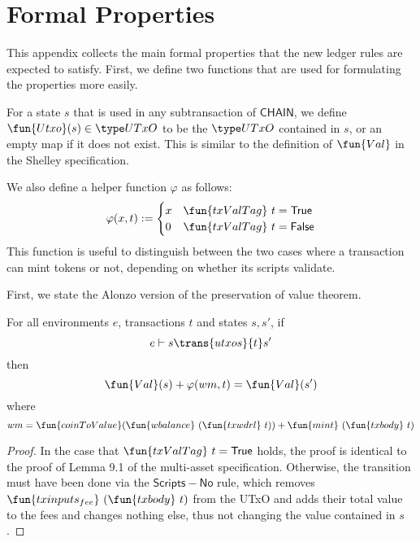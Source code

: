 \newcommand{\Val}{\fun{Val}}
\newcommand{\Utxo}{\fun{Utxo}}

\section{Formal Properties}
\label{sec:properties}

This appendix collects the main formal properties that the new ledger
rules are expected to satisfy. First, we define two functions that are
used for formulating the properties more easily.

\begin{definition}
  For a state $s$ that is used in any subtransaction of
  $\mathsf{CHAIN}$, we define $\Utxo(s) \in \UTxO$ to be the $\UTxO$
  contained in $s$, or an empty map if it does not exist. This is
  similar to the definition of $\Val$ in the Shelley specification.
\end{definition}

We also define a helper function $\varphi$ as follows:
\[\varphi(x, t) :=
  \begin{cases}
    x & \fun{txValTag}~t = \True \\
    0 & \fun{txValTag}~t = \False
  \end{cases}\]
This function is useful to distinguish between the two
cases where a transaction can mint tokens or not, depending on whether
its scripts validate.

First, we state the Alonzo version of the preservation of value theorem.

\begin{lemma}
  For all environments $e$, transactions $t$ and states $s, s'$, if
  \begin{equation*}
    e\vdash s\trans{utxos}{t}s'
  \end{equation*}
  then
  \begin{equation*}
    \Val(s) + \varphi(wm, t) = \Val(s')
  \end{equation*}
  where
  \begin{equation*}
    wm = \fun{coinToValue} (\fun{wbalance}~(\fun{txwdrl}~t)) + \fun{mint}~(\fun{txbody}~t)
  \end{equation*}
\end{lemma}
\begin{proof}
  In the case that $\fun{txValTag}~t = \True$ holds, the proof is
  identical to the proof of Lemma 9.1 of the multi-asset
  specification. Otherwise, the transition must have been done via the
  $\mathsf{Scripts-No}$ rule, which removes
  $\fun{txinputs_{fee}}~(\fun{txbody}~t)$ from the UTxO and adds their
  total value to the fees and changes nothing else, thus not changing the value contained in $s$.
\end{proof}

